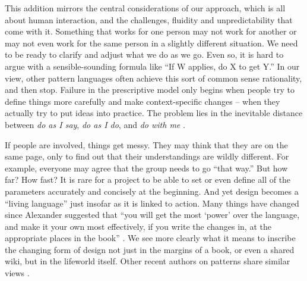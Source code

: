 
This addition mirrors the central considerations of our approach, which is all about human interaction, and the challenges, fluidity and unpredictability that come with it.  Something that works for one person may not work for another or may not even work for the same person in a slightly different situation.  We need to be ready to clarify and adjust what we do as we go.   Even so, it is hard to argue with a sensible-sounding formula like ``If W applies, do X to get Y.'' In our view, other pattern languages often achieve this sort of common sense rationality, and then stop.  Failure in the prescriptive model only begins when people try to define things more carefully and make context-specific changes -- when they actually try to put ideas into practice.  The problem lies in the inevitable distance between \emph{do as I say}, \emph{do as I do}, and \emph{do with me} \cite[p.~26]{deleuze1994difference}.

If people are involved, things get messy.   They may think that they are on the same page, only to find out that their understandings are wildly different.  For  example, everyone may agree that the group needs to go ``that way.''  But how far?  How fast?  It is rare for a project to be able to set or even define all of the parameters accurately and concisely at the beginning.
And yet design becomes a ``living language'' \cite[p.~xvii]{alexander1977pattern}  just insofar as it is linked to action.  Many things have changed since Alexander suggested that ``you will get the most `power' over the language, and make it your own most effectively, if you write the changes in, at the appropriate places in the book'' \cite[p.~xl]{alexander1977pattern}.  We see more clearly what it means to inscribe the changing form of design not just in the margins of a book, or even a shared wiki, but in the lifeworld itself.  Other recent authors on patterns share similar views \cite{reiners2012approach, plast-project, schummer2014beyond}.


